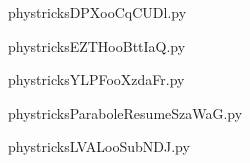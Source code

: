     

    \clearpage
    


    \newcommand{\CaptionFigDPXooCqCUDl}{<+Type your caption here+>}
    \begin{center}
        
    \end{center}
    phystricksDPXooCqCUDl.py

    

    \clearpage
    


    \newcommand{\CaptionFigEZTHooBttIaQ}{<+Type your caption here+>}
    \begin{center}
        
    \end{center}
    phystricksEZTHooBttIaQ.py

    

    \clearpage
    


    \newcommand{\CaptionFigYLPFooXzdaFr}{<+Type your caption here+>}
    \begin{center}
        
    \end{center}
    phystricksYLPFooXzdaFr.py

    

    \clearpage
    


    \newcommand{\CaptionFigParaboleResumeSzaWaG}{<+Type your caption here+>}
    \begin{center}
        
    \end{center}
    phystricksParaboleResumeSzaWaG.py

    

    \clearpage
    


    \newcommand{\CaptionFigLVALooSubNDJ}{<+Type your caption here+>}
    \begin{center}
        
    \end{center}
    phystricksLVALooSubNDJ.py

    

    \clearpage
    

